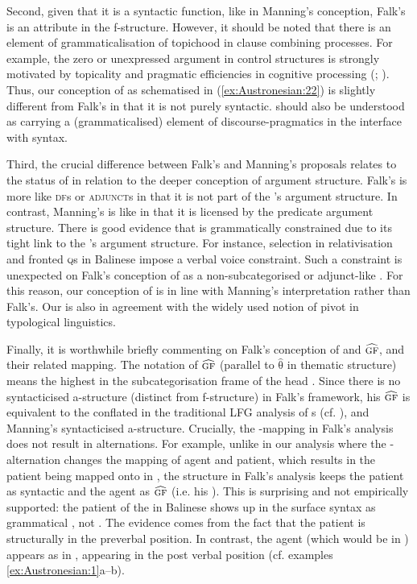 \documentclass[output=paper,chinesefont]{../langscibook}
\begin{document}
Second, given that it is a syntactic function, like in Manning's conception, Falk's \PIVOT is an attribute in the f-structure. However, it should be noted that there is an element of grammaticalisation of topichood in clause combining processes. For example, the zero or unexpressed argument in control structures is strongly motivated by topicality and pragmatic efficiencies in cognitive processing (\citealt[219]{Givon2001}; \citealt[163-165]{Hawkins2004}). Thus, our conception of \PIVOT as schematised in (\ref{ex:Austronesian:22}) is slightly different from Falk's in that it is not purely syntactic. \PIVOT should also be understood as carrying a (grammaticalised) element of discourse-pragmatics in the interface with syntax.

Third, the crucial difference between Falk's and Manning's proposals relates to the status of \PIVOT in relation to the deeper conception of argument structure. Falk's \PIVOT is more like \textsc{df}s or \textsc{adjunct}s in that it is not part of the \PRED's argument structure. In contrast, Manning's \PIVOT is like \SUBJ in that it is licensed by the predicate argument structure. There is good evidence that \PIVOT is grammatically constrained due to its tight link to the \PRED's argument structure. For instance, \PIVOT selection in relativisation and fronted \textsc{q}s in Balinese impose a verbal voice constraint. Such a constraint is unexpected on Falk's conception of \PIVOT as a non-subcategorised or adjunct-like \GF. For this reason, our conception of \PIVOT is in line with Manning's interpretation rather than Falk's. Our \PIVOT is also in agreement with the widely used notion of pivot in typological linguistics.

Finally, it is worthwhile briefly commenting on Falk's conception of \PIVOT and $\widehat{\textsc{gf}}$, and their related mapping. The notation of $\widehat{\textsc{gf}}$ (parallel to $\widehat{\mbox{θ}}$ in thematic structure) means the highest \GF in the subcategorisation frame of the head \PRED. Since there is no syntacticised a-structure (distinct from f-structure) in Falk's framework, his $\widehat{\textsc{gf}}$ is equivalent to the conflated \SUBJ in the traditional LFG analysis of {\GF}s (cf. \citealt{bresnan1989locative}), and Manning's syntacticised a-structure. Crucially, the \GF-\PIVOT mapping in Falk's analysis does not result in \GF alternations. For example, unlike in our analysis where the \AV-\UV alternation changes the mapping of agent and patient, which results in the patient being mapped onto \SUBJ in \UV, the \UV structure in Falk's analysis keeps the patient as syntactic \OBJ and the agent as $\widehat{\textsc{gf}}$ (i.e. his \SUBJ). This is surprising and not empirically supported: the patient of the \UV in Balinese shows up in the surface syntax as grammatical \SUBJ, not \OBJ. The evidence comes from the fact that the patient is structurally in the preverbal \SUBJ position. In contrast, the agent (which would be \SUBJ in \AV) appears as \OBJ in \UV, appearing in the post verbal position (cf. examples \ref{ex:Austronesian:1}a--b).
\end{document}
